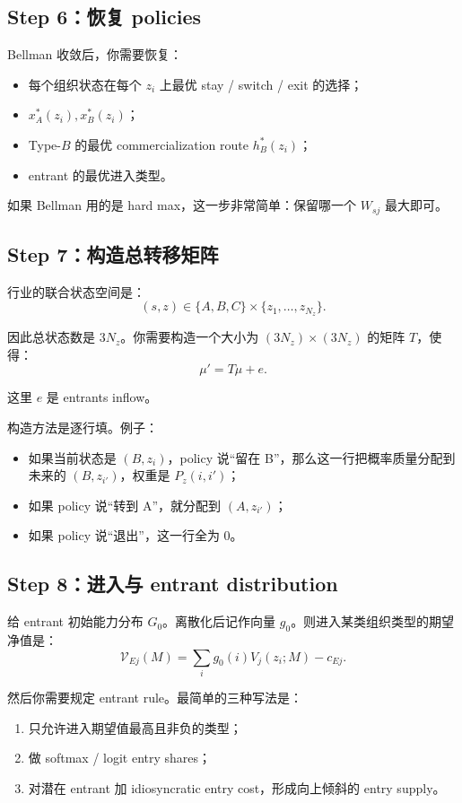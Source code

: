 \documentclass[12pt]{ctexart}
\begin{document}
\subsection{Step 6：恢复 policies}

Bellman 收敛后，你需要恢复：
\begin{itemize}
    \item 每个组织状态在每个 $z_i$ 上最优 stay / switch / exit 的选择；
    \item $x_A^*(z_i),x_B^*(z_i)$；
    \item Type-$B$ 的最优 commercialization route $h_B^*(z_i)$；
    \item entrant 的最优进入类型。
\end{itemize}

如果 Bellman 用的是 hard max，这一步非常简单：保留哪一个 $W_{sj}$ 最大即可。

\subsection{Step 7：构造总转移矩阵}

行业的联合状态空间是：
\[
(s,z)\in \{A,B,C\}\times \{z_1,\dots,z_{N_z}\}.
\]

因此总状态数是 $3N_z$。你需要构造一个大小为 $(3N_z)\times(3N_z)$ 的矩阵 $T$，使得：
\[
\mu' = T\mu + e.
\]

这里 $e$ 是 entrants inflow。

构造方法是逐行填。例子：
\begin{itemize}
    \item 如果当前状态是 $(B,z_i)$，policy 说“留在 B”，那么这一行把概率质量分配到未来的 $(B,z_{i'})$，权重是 $P_z(i,i')$；
    \item 如果 policy 说“转到 A”，就分配到 $(A,z_{i'})$；
    \item 如果 policy 说“退出”，这一行全为 0。
\end{itemize}

\subsection{Step 8：进入与 entrant distribution}

给 entrant 初始能力分布 $G_0$。离散化后记作向量 $g_0$。则进入某类组织类型的期望净值是：
\[
\mathcal V_{Ej}(M)=\sum_i g_0(i)V_j(z_i;M)-c_{Ej}.
\]

然后你需要规定 entrant rule。最简单的三种写法是：
\begin{enumerate}
    \item 只允许进入期望值最高且非负的类型；
    \item 做 softmax / logit entry shares；
    \item 对潜在 entrant 加 idiosyncratic entry cost，形成向上倾斜的 entry supply。
\end{enumerate}
\end{document}
